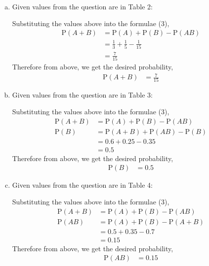\documentclass[journal,12pt,twocolumn]{article}\usepackage[margin=1.25 in]{geometry}
\providecommand{\pr}[1]{\ensuremath{\text{P}\left(#1\right)}}
\begin{document}
\begin{enumerate}[(a)]
    \item Given values from the question are in Table 2:\\
    	\begin{table}[h!]
			\label{table}
			
			\caption{}
		\end{table}
		
		\noindent Substituting the values above into the formulae (3),
		\begin{align*}
		\pr{A + B} & = \pr A + \pr B - \pr{AB} \\
		& = \frac{1}{3} + \frac{1}{5} - \frac{1}{15} \\
		& = \frac{7}{15}
		\end{align*}
		Therefore from above, we get the desired probability,
		\begin{align*}
		\pr{A + B} & = \frac{7}{15}
		\end{align*}
	\item Given values from the question are in Table 3:\\
		\begin{table}[h!]
			\label{table}
			
			\caption{}
		\end{table}
		
		\noindent Substituting the values above into the formulae (3),
		\begin{align*}
		\pr{A + B} & = \pr A + \pr B - \pr{AB} \\
		\pr B & = \pr{A + B} + \pr{AB} - \pr B \\
		& = 0.6 + 0.25 - 0.35 \\
		& = 0.5
		\end{align*}
		Therefore from above, we get the desired probability,
		\begin{align*}
		\pr{B} & = 0.5
		\end{align*}
	\item Given values from the question are in Table 4:\\
		\begin{table}[h!]
			\label{table}
			
			\caption{}
		\end{table}
		
		\noindent Substituting the values above into the formulae (3),
		\begin{align*}
		\pr{A + B} & = \pr A + \pr B - \pr{AB} \\
		\pr{AB} & = \pr{A} + \pr{B} - \pr{A + B} \\
		& = 0.5 + 0.35 - 0.7 \\
		& = 0.15
		\end{align*}
		Therefore from above, we get the desired probability,
		\begin{align*}
		\pr{AB} & = 0.15
		\end{align*}
\end{enumerate}
\end{document}
